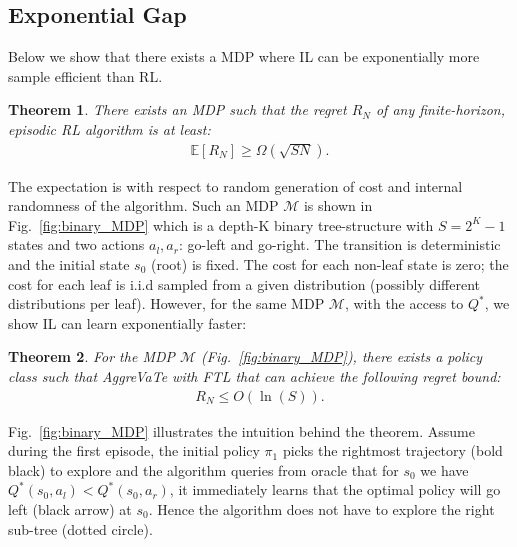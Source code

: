 \documentclass{article}
\newtheorem{theorem}{Theorem}[section]
\begin{document}
\subsection{Exponential Gap}
\label{sec:special_mdp}
Below we show that there exists a MDP where IL can be exponentially more sample efficient than RL.
\begin{theorem}
\label{them:special_lower}
There exists an MDP such that the regret $R_N$ of any finite-horizon, episodic RL algorithm is at least:
\begin{align}
\mathbb{E}[R_N] \geq \Omega(\sqrt{SN}).
\end{align} 
\end{theorem} The expectation is with respect to random generation of cost and internal randomness of the algorithm. Such an MDP $\mathcal{M}$ is shown in Fig.~\ref{fig:binary_MDP} which is a depth-K binary tree-structure with $S = 2^K-1$ states and two actions ${a_l, a_r}$:  go-left and go-right. The transition is deterministic and the initial state $s_0$ (root) is fixed. %
The cost for each non-leaf state is zero; the cost for each leaf is i.i.d sampled from a given distribution (possibly different distributions per leaf).  However, for the same MDP $\mathcal{M}$, with the access to $Q^*$, we show IL can learn exponentially faster:%
\begin{theorem}
\label{them:special_upper}
For the MDP ${\mathcal{M}}$ (Fig.~\ref{fig:binary_MDP}), there exists a policy class such that AggreVaTe with FTL that can achieve the following regret bound:
\begin{align}
R_N \leq O(\ln{(S)}).
\end{align}
\end{theorem}
Fig.~\ref{fig:binary_MDP} illustrates the intuition behind the theorem. Assume during the first episode, the initial policy $\pi_1$ picks the rightmost trajectory (bold black) to explore and the algorithm queries from oracle that for $s_0$ we have $Q^*(s_0,a_l)<Q^*(s_0,a_r)$, it immediately learns that the optimal policy will go left (black arrow) at $s_0$. Hence the algorithm does not have to explore the right sub-tree (dotted circle).
\end{document}
